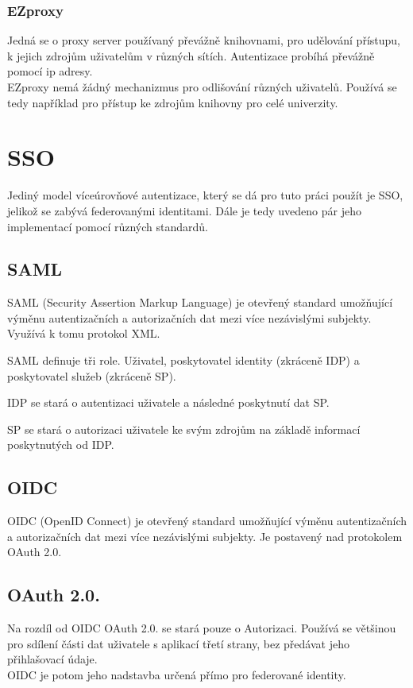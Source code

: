 \subsection{EZproxy}
Jedná se o proxy server používaný převážně knihovnami, pro udělování přístupu, k jejich zdrojům uživatelům v různých sítích. Autentizace probíhá převážně pomocí ip adresy.\\
EZproxy nemá žádný mechanizmus pro odlišování různých uživatelů. Používá se tedy například pro přístup ke zdrojům knihovny pro celé univerzity. \cite{EZproxy}\cite{wikiEZproxy}

\chapter{SSO}
Jediný model víceúrovňové autentizace, který se dá pro tuto práci použít je SSO, jelikož se zabývá federovanými identitami.
Dále je tedy uvedeno pár jeho implementací pomocí různých standardů. 

\section{SAML}

SAML\cite{SAMLofficialSite}\cite{WhatIsSaml} (Security Assertion Markup Language) je otevřený standard umožňující výměnu autentizačních a autorizačních dat mezi více nezávislými subjekty. Využívá k tomu protokol XML. 

SAML definuje tři role. Uživatel, poskytovatel identity (zkráceně IDP) a poskytovatel služeb (zkráceně SP). 

IDP se stará o autentizaci uživatele a následné poskytnutí dat SP.

SP se stará o autorizaci uživatele ke svým zdrojům na základě informací poskytnutých od IDP.

\section{OIDC}

OIDC (OpenID Connect) je otevřený standard umožňující výměnu autentizačních a autorizačních dat mezi více nezávislými subjekty. Je postavený nad protokolem OAuth 2.0.\cite{OIDC}

\section{OAuth 2.0.}
Na rozdíl od OIDC OAuth 2.0. se stará pouze o Autorizaci. Používá se většinou pro sdílení části dat uživatele s aplikací třetí strany, bez předávat jeho přihlašovací údaje. \\
OIDC je potom jeho nadstavba určená přímo pro federované identity. \cite{OAUTHvSAMLvOIDC}

